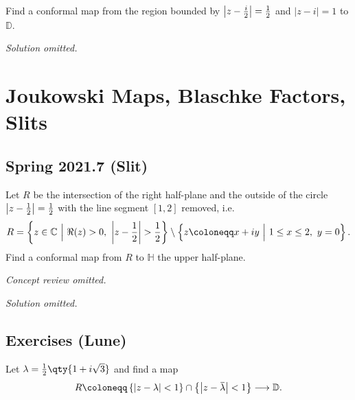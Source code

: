\begin{problem}

Find a conformal map from the region bounded by
\({\left\lvert {z - {i\over 2}} \right\rvert} = {1\over 2}\) and
\({\left\lvert {z-i} \right\rvert} = 1\) to \({\mathbb{D}}\).

\end{problem}

\emph{Solution omitted.}

\hypertarget{joukowski-maps-blaschke-factors-slits}{%
\section{Joukowski Maps, Blaschke Factors,
Slits}\label{joukowski-maps-blaschke-factors-slits}}

\hypertarget{spring-2021.7-slit}{%
\subsection{Spring 2021.7 (Slit)}\label{spring-2021.7-slit}}

\begin{problem}[?]

Let \(R\) be the intersection of the right half-plane and the outside of
the circle \({\left\lvert {z - {1\over 2}} \right\rvert} = {1\over 2}\)
with the line segment \([1, 2]\) removed, i.e.~
\begin{align*}
R = \left\{{z\in {\mathbb{C}}{~\mathrel{\Big\vert}~}\Re(z) > 0,\,\, {\left\lvert {z-{1\over 2}} \right\rvert} > {1\over 2} }\right\} \setminus\left\{{z \coloneqq x+iy {~\mathrel{\Big\vert}~}1\leq x\leq 2,\,\, y=0}\right\}
.\end{align*}
Find a conformal map from \(R\) to \({\mathbb{H}}\) the upper
half-plane.

\end{problem}

\emph{Concept review omitted.}

\emph{Solution omitted.}

\hypertarget{exercises-lune}{%
\subsection{Exercises (Lune)}\label{exercises-lune}}

\begin{problem}[?]

Let \(\lambda = {1\over 2}\qty{1 + i \sqrt{3}}\) and find a map
\begin{align*}
R \coloneqq\left\{{{\left\lvert {z - \lambda} \right\rvert} < 1}\right\} \cap\left\{{{\left\lvert {z-\mkern 1.5mu\overline{\mkern-1.5mu\lambda\mkern-1.5mu}\mkern 1.5mu} \right\rvert} < 1 }\right\} \longrightarrow{\mathbb{D}}
.\end{align*}

\end{problem}

